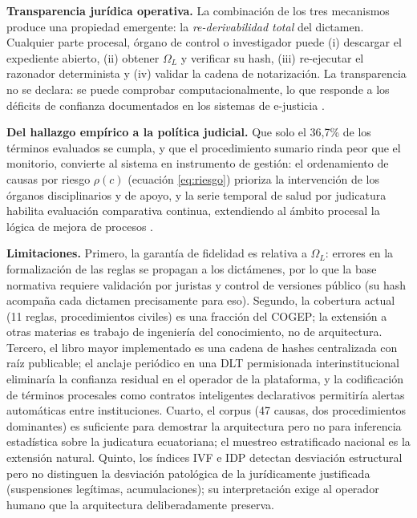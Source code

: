 \documentclass[computers,article,submit,pdftex,moreauthors]{Definitions/mdpi}
\begin{document}
\textbf{Transparencia jurídica operativa.} La combinación de los tres mecanismos produce una propiedad emergente: la \emph{re-derivabilidad total} del dictamen. Cualquier parte procesal, órgano de control o investigador puede (i) descargar el expediente abierto, (ii) obtener $\Omega_L$ y verificar su hash, (iii) re-ejecutar el razonador determinista y (iv) validar la cadena de notarización. La transparencia no se declara: se puede comprobar computacionalmente, lo que responde a los déficits de confianza documentados en los sistemas de e-justicia \cite{Rosa2013,Lupo2014}.

\textbf{Del hallazgo empírico a la política judicial.} Que solo el 36{,}7\% de los términos evaluados se cumpla, y que el procedimiento sumario rinda peor que el monitorio, convierte al sistema en instrumento de gestión: el ordenamiento de causas por riesgo $\rho(c)$ (ecuación \eqref{eq:riesgo}) prioriza la intervención de los órganos disciplinarios y de apoyo, y la serie temporal de salud por judicatura habilita evaluación comparativa continua, extendiendo al ámbito procesal la lógica de mejora de procesos \cite{Aalst2013}.

\textbf{Limitaciones.} Primero, la garantía de fidelidad es relativa a $\Omega_L$: errores en la formalización de las reglas se propagan a los dictámenes, por lo que la base normativa requiere validación por juristas y control de versiones público (su hash acompaña cada dictamen precisamente para eso). Segundo, la cobertura actual (11 reglas, procedimientos civiles) es una fracción del COGEP; la extensión a otras materias es trabajo de ingeniería del conocimiento, no de arquitectura. Tercero, el libro mayor implementado es una cadena de hashes centralizada con raíz publicable; el anclaje periódico en una DLT permisionada interinstitucional \cite{Olnes2017,Zheng2018} eliminaría la confianza residual en el operador de la plataforma, y la codificación de términos procesales como contratos inteligentes declarativos \cite{Governatori2018,Christidis2016} permitiría alertas automáticas entre instituciones. Cuarto, el corpus (47 causas, dos procedimientos dominantes) es suficiente para demostrar la arquitectura pero no para inferencia estadística sobre la judicatura ecuatoriana; el muestreo estratificado nacional es la extensión natural. Quinto, los índices IVF e IDP detectan desviación estructural pero no distinguen la desviación patológica de la jurídicamente justificada (suspensiones legítimas, acumulaciones); su interpretación exige al operador humano que la arquitectura deliberadamente preserva.
\end{document}
